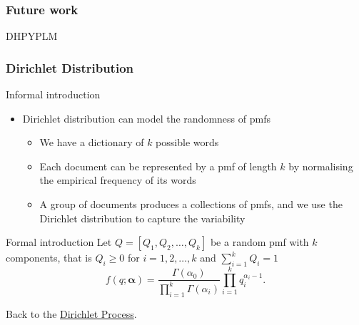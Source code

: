 \begin{frame}
    \frametitle{Future work}

    DHPYPLM
\end{frame}
\note{

}

\appendix
\begin{frame}[label=dirichletsupplemental]
    \frametitle{Dirichlet Distribution}

    \begin{block}{Informal introduction}
        \begin{itemize}
            \item Dirichlet distribution can model the randomness of pmfs
            \begin{itemize}
                \item We have a dictionary of $k$ possible words
                \item Each document can be represented by a pmf of length $k$ by normalising the empirical frequency of its words
                \item A group of documents produces a collections of pmfs, and we use the Dirichlet distribution to capture the variability
            \end{itemize}
        \end{itemize}
    \end{block}

    \begin{block}{Formal introduction}
        Let $Q = [Q_1, Q_2,\ldots,Q_k]$ be a random pmf with $k$ components, that is $Q_i \geq 0$ for $i=1,2,\ldots,k$ and $\sum_{i=1}^k Q_i = 1$
        \[ f(q;\boldsymbol\alpha) = \frac{\Gamma(\alpha_0)}{\prod_{i=1}^k\Gamma(\alpha_i)}\prod_{i=1}^kq_i^{\alpha_i-1}. \]
    \end{block}
Back to the \hyperlink{dirichletprocess}{Dirichlet Process}.
\end{frame}
